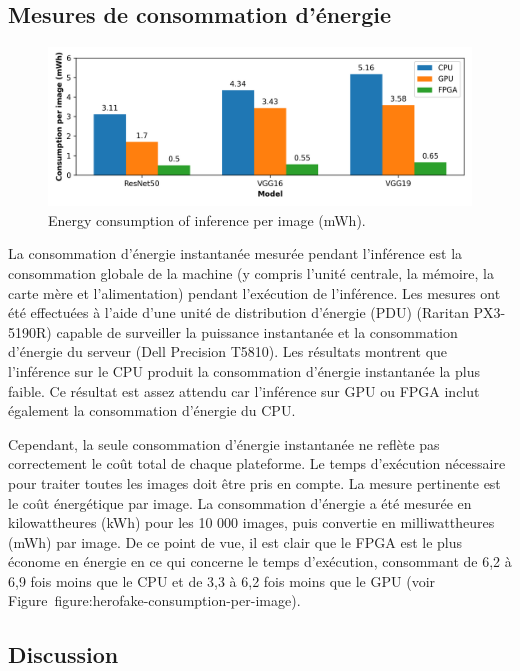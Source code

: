 \subsection{Mesures de consommation d'énergie}

\begin{figure}[t]
\centering
\includegraphics[width=\columnwidth]{4_Chapitre4/figures/characterization/consumption_per_image.png}
\caption{Energy consumption of inference per image (mWh).}
\label{figure:herofake-consumption-per-image}
\end{figure}

La consommation d'énergie instantanée mesurée pendant l'inférence est la consommation globale de la machine (y compris l'unité centrale, la mémoire, la carte mère et l'alimentation) pendant l'exécution de l'inférence. 
Les mesures ont été effectuées à l'aide d'une unité de distribution d'énergie (PDU) (Raritan PX3-5190R) capable de surveiller la puissance instantanée et la consommation d'énergie du serveur (Dell Precision T5810). Les résultats montrent que l'inférence sur le CPU produit la consommation d'énergie instantanée la plus faible. Ce résultat est assez attendu car l'inférence sur GPU ou FPGA inclut également la consommation d'énergie du CPU.


Cependant, la seule consommation d'énergie instantanée ne reflète pas correctement le coût total de chaque plateforme. Le temps d'exécution nécessaire pour traiter toutes les images doit être pris en compte. La mesure pertinente est le coût énergétique par image. La consommation d'énergie a été mesurée en kilowattheures (kWh) pour les 10 000 images, puis convertie en milliwattheures (mWh) par image. De ce point de vue, il est clair que le FPGA est le plus économe en énergie en ce qui concerne le temps d'exécution, consommant de 6,2 à 6,9 fois moins que le CPU et de 3,3 à 6,2 fois moins que le GPU (voir Figure~{figure:herofake-consumption-per-image}).

\subsection{Discussion}

